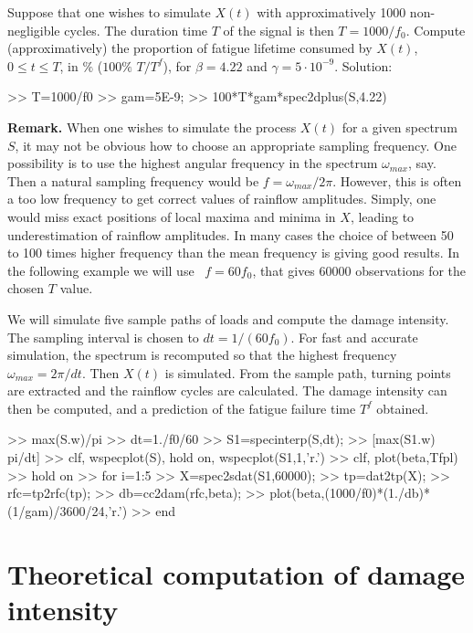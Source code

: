 Suppose that one wishes to simulate $X(t)$ with approximatively
1000  non-negligible cycles. The duration time $T$ of the
signal is then $T=1000/f_0$. Compute (approximatively) the proportion
of fatigue lifetime consumed by $X(t)$, $0\le t\le T$,
in $\%$ ($100\%\,\,T/T^f$), for $\beta=4.22$ and $\gamma=5\cdot10^{-9}$.
Solution:
\begin{code}
>> T=1000/f0 %
>> gam=5E-9;
>> 100*T*gam*spec2dplus(S,4.22) %
\end{code}


\textbf{Remark.} When one wishes to simulate the process $X(t)$ for
a given spectrum $S$, it may not be obvious how to choose an
appropriate sampling frequency. One possibility is to use the
highest angular frequency in the spectrum $\omega_{max}$, say. Then
a natural sampling frequency would be $f=\omega_{max}/2\pi$.
However, this is often a too low frequency to get correct values of
rainflow amplitudes. Simply, one would miss exact positions of local
maxima and minima in $X$, leading to  underestimation of rainflow
amplitudes. In many cases the choice of between 50 to 100 times
higher frequency than the mean frequency is giving good results. In
the following  example we will use ~$f=60f_0$, that gives 60000
observations for the chosen $T$ value.

We will simulate five sample paths of loads and compute the damage
intensity. The sampling interval is chosen to $dt=1/(60f_0)$. For
fast and accurate simulation, the spectrum is recomputed so that the
highest frequency $\omega_{max}=2\pi/dt$. Then $X(t)$ is simulated.
From the sample path, turning points are extracted and the rainflow
cycles are calculated. The damage intensity can then be computed,
and a prediction of the fatigue failure time $T^f$ obtained.
\begin{code}
>> max(S.w)/pi
>> dt=1./f0/60
>> S1=specinterp(S,dt);
>> [max(S1.w) pi/dt]
>> clf, wspecplot(S), hold on, wspecplot(S1,1,'r.')
>> clf, plot(beta,Tfpl)
>> hold on
>> for  i=1:5
>>   X=spec2sdat(S1,60000);
>>   tp=dat2tp(X);
>>   rfc=tp2rfc(tp);
>>   db=cc2dam(rfc,beta);
>>   plot(beta,(1000/f0)*(1./db)*(1/gam)/3600/24,'r.') %
>> end
\end{code}


\section{Theoretical computation of damage intensity}

